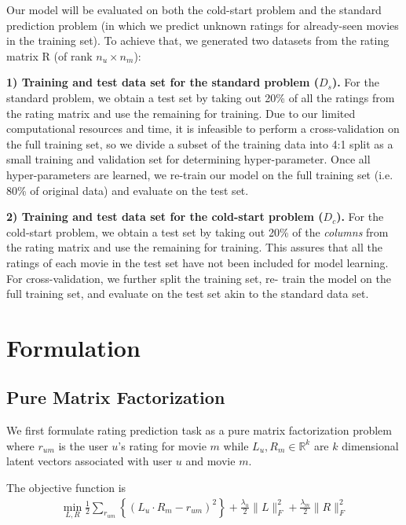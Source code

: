 \documentclass{article} %
\begin{document}
	Our model will be evaluated on both the cold-start problem and the standard
	prediction problem (in which we predict unknown ratings for already-seen
	movies in the training set). To achieve that, we generated two datasets from the
	rating matrix R (of rank $n_u \times n_m$):

	\textbf{1) Training and test data set for the standard problem ($D_s$).}
	For the standard problem, we obtain a test set by taking out 20\% of all the
	ratings from the rating matrix and use the remaining for training.
	Due to our limited computational resources and time, it is infeasible to
	perform a cross-validation on the full training set, so we divide a subset
	of the training data into 4:1 split as a small training and validation set
	for determining hyper-parameter.  Once all hyper-parameters are learned, we
	re-train our model on the full training set (i.e. 80\% of original data) and
	evaluate on the test set.

  \textbf{2) Training and test data set for the cold-start problem ($D_c$).}
For the cold-start problem, we obtain a test set by taking out 20\% of   the
{\em columns} from the rating matrix and use the remaining for training. This
assures that all the ratings of each movie in the test set have not been
included for model learning.   For cross-validation, we further split the
training set, re- train the model on the full training set, and evaluate on
the test set akin to the standard data set.


\section{Formulation}

	\subsection{Pure Matrix Factorization}

	We first formulate rating prediction task as a pure matrix factorization
	problem  where $r_{um}$ is the user $u$'s rating for movie $m$ while $L_u,
	R_m \in \mathbb{R}^k$ are $k$ dimensional latent vectors associated with
	user $u$ and movie $m$.

	The objective function is
	\begin{align}
	\min_{L, R} \frac{1}{2}\sum_{r_{um}} \left\{(L_u \cdot R_m - r_{um})^2\right\}
		+ \frac{\lambda_u}{2}\|L\|^2_F + \frac{\lambda_m}{2}\|R\|^2_F \label{eq:mf}
	\end{align}
\end{document}
